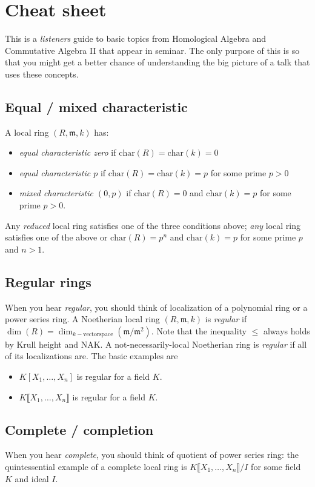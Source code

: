 \documentclass[12pt]{amsart}
\newcommand{\m}{\mathfrak{m}}
\begin{document}
	

	
\section*{Cheat sheet}

This is a \emph{listeners} guide to basic topics from Homological Algebra and Commutative Algebra \textsc{II} that appear in seminar. The only purpose of this is so that you might get a better chance of understanding the big picture of a talk that uses these concepts.

\subsection*{Equal / mixed characteristic} A local ring $(R,\m,k)$ has:
\begin{itemize}
\item \textit{equal characteristic zero} if $\mathrm{char}(R)=\mathrm{char}(k)=0$
\item \textit{equal characteristic $p$} if $\mathrm{char}(R)=\mathrm{char}(k)=p$ for some prime $p>0$
\item \textit{mixed characteristic $(0,p)$} if $\mathrm{char}(R)=0$ and $\mathrm{char}(k)=p$ for some prime $p>0$.
\end{itemize}
Any \emph{reduced} local ring satisfies one of the three conditions above; \emph{any} local ring satisfies one of the above or $\mathrm{char}(R)=p^n$ and $\mathrm{char}(k)=p$ for some prime $p$ and $n>1$.


\subsection*{Regular rings} When you hear \emph{regular}, you should think of localization of a polynomial ring or a power series ring. A Noetherian local ring $(R,\m,k)$ is \emph{regular} if $\dim(R) = \dim_{k-\text{vectorspace}}(\m/\m^2)$. Note that the inequality $\leq$ always holds by Krull height and NAK. A not-necessarily-local Noetherian ring is \emph{regular} if all of its localizations are. The basic examples are
\begin{itemize}
\item $K[X_1,\dots,X_n]$ is regular for a field $K$.
\item $K\llbracket X_1,\dots,X_n\rrbracket$ is regular for a field $K$.
\end{itemize}



\subsection*{Complete / completion} When you hear \emph{complete}, you should think of quotient of power series ring: the quintessential example of a complete local ring is $K\llbracket X_1,\dots,X_n \rrbracket / I$ for some field $K$ and ideal $I$.
\end{document}
